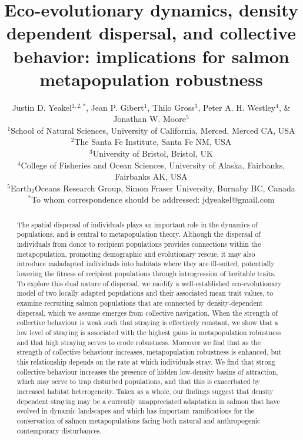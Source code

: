 \documentclass{revtex4}
\begin{document}
\title{Eco-evolutionary dynamics, density dependent dispersal, and collective behavior: implications for salmon metapopulation robustness}
\author{
Justin D. Yeakel${}^{1,2,*}$, Jean P. Gibert${}^{1}$, Thilo Gross${}^3$, Peter A. H. Westley${}^{4}$, \& Jonathan W. Moore${}^{5}$ \\
${}^1$School of Natural Sciences, University of California, Merced, Merced CA, USA \\
${}^2$The Santa Fe Institute, Santa Fe NM, USA \\
${}^3$University of Bristol, Bristol, UK\\
${}^4$College of Fisheries and Ocean Sciences, University of Alaska, Fairbanks, Fairbanks AK, USA \\
${}^5$Earth${}_2$Oceans Research Group, Simon Fraser University, Burnaby BC, Canada \\
${}^*$To whom correspondence should be addressed: jdyeakel@gmail.com
}




\begin{abstract} %
The spatial dispersal of individuals plays an important role in the dynamics of populations, and is central to metapopulation theory. Although the dispersal of individuals from donor to recipient populations provides connections within the metapopulation, promoting demographic and evolutionary rescue, it may also introduce maladapted individuals into habitats where they are ill-suited, potentially lowering the fitness of recipient populations through introgression of heritable traits. To explore this dual nature of dispersal, we modify a well-established eco-evolutionary model of two locally adapted populations and their associated mean trait values, to examine recruiting salmon populations that are connected by density-dependent dispersal, which we assume emerges from collective navigation. When the strength of collective behaviour is weak such that straying is effectively constant, we show that a low level of straying is associated with the highest gains in metapopulation robustness and that high straying serves to erode robustness. Moreover we find that as the strength of collective behaviour increases, metapopulation robustness is enhanced, but this relationship depends on the rate at which individuals stray. We find that strong collective behaviour increases the presence of hidden low-density basins of attraction, which may serve to trap disturbed populations, and that this is exacerbated by increased habitat heterogeneity. Taken as a whole, our findings suggest that density dependent straying may be a currently unappreciated adaptation in salmon that have evolved in dynamic landscapes and which has important ramifications for the conservation of salmon metapopulations facing both natural and anthropogenic contemporary disturbances.
\end{abstract} 
\end{document}
